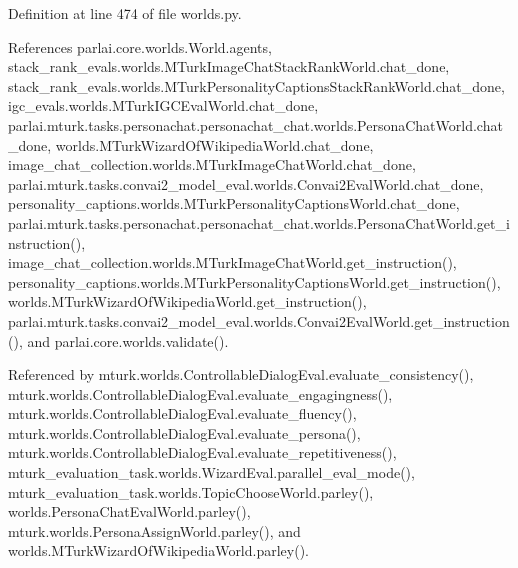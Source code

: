 Definition at line 474 of file worlds.\+py.



References parlai.\+core.\+worlds.\+World.\+agents, stack\+\_\+rank\+\_\+evals.\+worlds.\+M\+Turk\+Image\+Chat\+Stack\+Rank\+World.\+chat\+\_\+done, stack\+\_\+rank\+\_\+evals.\+worlds.\+M\+Turk\+Personality\+Captions\+Stack\+Rank\+World.\+chat\+\_\+done, igc\+\_\+evals.\+worlds.\+M\+Turk\+I\+G\+C\+Eval\+World.\+chat\+\_\+done, parlai.\+mturk.\+tasks.\+personachat.\+personachat\+\_\+chat.\+worlds.\+Persona\+Chat\+World.\+chat\+\_\+done, worlds.\+M\+Turk\+Wizard\+Of\+Wikipedia\+World.\+chat\+\_\+done, image\+\_\+chat\+\_\+collection.\+worlds.\+M\+Turk\+Image\+Chat\+World.\+chat\+\_\+done, parlai.\+mturk.\+tasks.\+convai2\+\_\+model\+\_\+eval.\+worlds.\+Convai2\+Eval\+World.\+chat\+\_\+done, personality\+\_\+captions.\+worlds.\+M\+Turk\+Personality\+Captions\+World.\+chat\+\_\+done, parlai.\+mturk.\+tasks.\+personachat.\+personachat\+\_\+chat.\+worlds.\+Persona\+Chat\+World.\+get\+\_\+instruction(), image\+\_\+chat\+\_\+collection.\+worlds.\+M\+Turk\+Image\+Chat\+World.\+get\+\_\+instruction(), personality\+\_\+captions.\+worlds.\+M\+Turk\+Personality\+Captions\+World.\+get\+\_\+instruction(), worlds.\+M\+Turk\+Wizard\+Of\+Wikipedia\+World.\+get\+\_\+instruction(), parlai.\+mturk.\+tasks.\+convai2\+\_\+model\+\_\+eval.\+worlds.\+Convai2\+Eval\+World.\+get\+\_\+instruction(), and parlai.\+core.\+worlds.\+validate().



Referenced by mturk.\+worlds.\+Controllable\+Dialog\+Eval.\+evaluate\+\_\+consistency(), mturk.\+worlds.\+Controllable\+Dialog\+Eval.\+evaluate\+\_\+engagingness(), mturk.\+worlds.\+Controllable\+Dialog\+Eval.\+evaluate\+\_\+fluency(), mturk.\+worlds.\+Controllable\+Dialog\+Eval.\+evaluate\+\_\+persona(), mturk.\+worlds.\+Controllable\+Dialog\+Eval.\+evaluate\+\_\+repetitiveness(), mturk\+\_\+evaluation\+\_\+task.\+worlds.\+Wizard\+Eval.\+parallel\+\_\+eval\+\_\+mode(), mturk\+\_\+evaluation\+\_\+task.\+worlds.\+Topic\+Choose\+World.\+parley(), worlds.\+Persona\+Chat\+Eval\+World.\+parley(), mturk.\+worlds.\+Persona\+Assign\+World.\+parley(), and worlds.\+M\+Turk\+Wizard\+Of\+Wikipedia\+World.\+parley().

